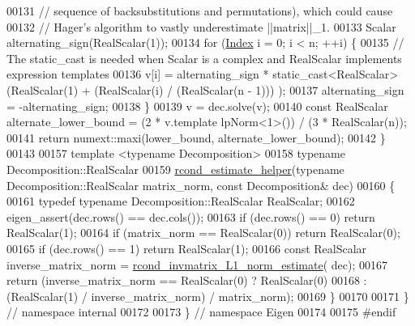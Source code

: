 \begin{DoxyCode}
00131   \textcolor{comment}{// sequence of backsubstitutions and permutations), which could cause}
00132   \textcolor{comment}{// Hager's algorithm to vastly underestimate ||matrix||\_1.}
00133   Scalar alternating\_sign(RealScalar(1));
00134   \textcolor{keywordflow}{for} (\hyperlink{namespace_eigen_a62e77e0933482dafde8fe197d9a2cfde}{Index} i = 0; i < n; ++i) \{
00135     \textcolor{comment}{// The static\_cast is needed when Scalar is a complex and RealScalar implements expression templates}
00136     v[i] = alternating\_sign * \textcolor{keyword}{static\_cast<}RealScalar\textcolor{keyword}{>}(RealScalar(1) + (RealScalar(i) / (RealScalar(n - 1)))
      );
00137     alternating\_sign = -alternating\_sign;
00138   \}
00139   v = dec.solve(v);
00140   \textcolor{keyword}{const} RealScalar alternate\_lower\_bound = (2 * v.template lpNorm<1>()) / (3 * RealScalar(n));
00141   \textcolor{keywordflow}{return} numext::maxi(lower\_bound, alternate\_lower\_bound);
00142 \}
00143 
00157 \textcolor{keyword}{template} <\textcolor{keyword}{typename} Decomposition>
00158 \textcolor{keyword}{typename} Decomposition::RealScalar
00159 \hyperlink{namespace_eigen_1_1internal_ad1de0d785387bfb5435c410bf0554068}{rcond\_estimate\_helper}(\textcolor{keyword}{typename} Decomposition::RealScalar matrix\_norm, \textcolor{keyword}{const} 
      Decomposition& dec)
00160 \{
00161   \textcolor{keyword}{typedef} \textcolor{keyword}{typename} Decomposition::RealScalar RealScalar;
00162   eigen\_assert(dec.rows() == dec.cols());
00163   \textcolor{keywordflow}{if} (dec.rows() == 0)              \textcolor{keywordflow}{return} RealScalar(1);
00164   \textcolor{keywordflow}{if} (matrix\_norm == RealScalar(0)) \textcolor{keywordflow}{return} RealScalar(0);
00165   \textcolor{keywordflow}{if} (dec.rows() == 1)              \textcolor{keywordflow}{return} RealScalar(1);
00166   \textcolor{keyword}{const} RealScalar inverse\_matrix\_norm = \hyperlink{namespace_eigen_1_1internal_aa3f5b3cfa34df750994a247d4823aa51}{rcond\_invmatrix\_L1\_norm\_estimate}(
      dec);
00167   \textcolor{keywordflow}{return} (inverse\_matrix\_norm == RealScalar(0) ? RealScalar(0)
00168                                                : (RealScalar(1) / inverse\_matrix\_norm) / matrix\_norm);
00169 \}
00170 
00171 \}  \textcolor{comment}{// namespace internal}
00172 
00173 \}  \textcolor{comment}{// namespace Eigen}
00174 
00175 \textcolor{preprocessor}{#endif}
\end{DoxyCode}
